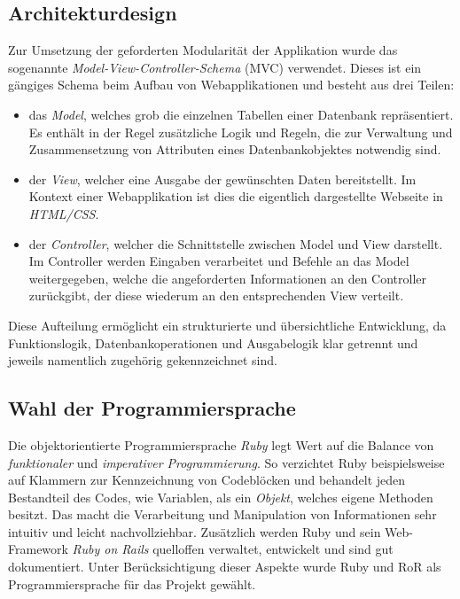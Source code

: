 \subsection{Architekturdesign}
\label{sec:Architekturdesign}
Zur Umsetzung der geforderten Modularität der Applikation wurde das sogenannte
\textit{Model-View-Controller-Schema} (\acs{MVC}) verwendet. Dieses ist ein gängiges Schema beim Aufbau von
Webapplikationen und besteht aus drei Teilen:
\begin{itemize}
	\item das \textit{Model}, welches grob die einzelnen Tabellen einer Datenbank repräsentiert. Es enthält in
	der Regel zusätzliche Logik und Regeln, die zur Verwaltung und Zusammensetzung von Attributen
	eines Datenbankobjektes notwendig sind.
	\item der \textit{View}, welcher eine Ausgabe der gewünschten Daten bereitstellt. Im Kontext einer
	Webapplikation ist dies die eigentlich dargestellte Webseite in \textit{HTML/CSS}.
	\item der \textit{Controller}, welcher die Schnittstelle zwischen Model und View darstellt.
	Im Controller werden Eingaben verarbeitet und Befehle an das Model weitergegeben, welche
	die angeforderten Informationen an den Controller zurückgibt, der diese wiederum an den
	entsprechenden View verteilt.
\end{itemize}
Diese Aufteilung ermöglicht ein strukturierte und übersichtliche Entwicklung, da Funktionslogik,
Datenbankoperationen und Ausgabelogik klar getrennt und jeweils namentlich zugehörig gekennzeichnet
sind.


\subsection{Wahl der Programmiersprache}
\label{sec:Wahl der Programmiersprache}
Die objektorientierte Programmiersprache \textit{Ruby} legt Wert auf die Balance von \textit{funktionaler} und
\textit{imperativer Programmierung}. So verzichtet Ruby beispielsweise auf Klammern zur Kennzeichnung
von Codeblöcken und behandelt jeden Bestandteil des Codes, wie Variablen, als ein \textit{Objekt},
welches eigene Methoden besitzt. Das macht die Verarbeitung und Manipulation von Informationen sehr
intuitiv und leicht nachvollziehbar. Zusätzlich werden Ruby und sein Web-Framework \textit{Ruby on Rails}
quelloffen verwaltet, entwickelt und sind gut dokumentiert. Unter Berücksichtigung dieser Aspekte
wurde Ruby und \acs{RoR} als Programmiersprache für das Projekt gewählt.

